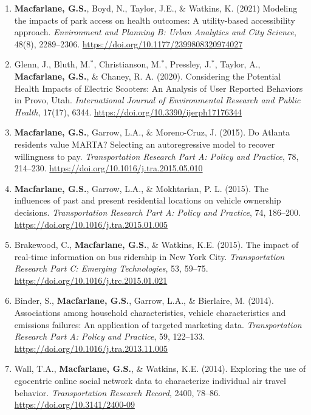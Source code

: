 \documentclass[margin,line]{res}
\newif\ifdetail
\newcounter{enuminitialize}
\newenvironment{myenum}[1][]
{%
 \setcounter{enuminitialize}{#1}
 \addtocounter{enuminitialize}{2}
 \begin{enumerate}[left= 4pt, itemsep=12pt, start=\value{enuminitialize}, label=\arabic*\addtocounter{enumi}{-2}]
}
{%
 \end{enumerate}
}
\begin{document}
\begin{resume}
\begin{myenum}[14]
  \item\textbf{Macfarlane, G.S.}, Boyd, N., Taylor, J.E., \& Watkins, K. (2021) Modeling the impacts of park access
on health outcomes: A utility-based accessibility approach. \textit{ Environment and
Planning B: Urban Analytics and City Science}, 48(8), 2289–2306. \url{https://doi.org/10.1177/2399808320974027}

  \item Glenn, J., Bluth, M.$^*$, Christianson, M.$^*$, Pressley, J.$^*$, Taylor, A.,
\textbf{Macfarlane, G.S.}, \& Chaney, R. A. (2020). Considering the Potential Health
Impacts of Electric Scooters: An Analysis of User Reported Behaviors in Provo,
Utah. \textit{ International Journal of Environmental Research and Public Health},
17(17), 6344. \url{https://doi.org/10.3390/ijerph17176344} \ifdetail Citations: 5  \fi

  \item\textbf{Macfarlane, G.S.}, Garrow, L.A., \& Moreno-Cruz, J. (2015). Do Atlanta
residents value MARTA? Selecting an autoregressive model to recover willingness
to pay. \textit{ Transportation Research Part A: Policy and Practice}, 78, 214–230.
\url{https://doi.org/10.1016/j.tra.2015.05.010} \ifdetail Citations: 8 \fi

  \item\textbf{Macfarlane, G.S.}, Garrow, L.A., \& Mokhtarian, P. L. (2015). The influences of
past and present residential locations on vehicle ownership decisions.
\textit{ Transportation Research Part A: Policy and Practice}, 74, 186–200.
\url{https://doi.org/10.1016/j.tra.2015.01.005} \ifdetail Citations: 40  \fi

  \item Brakewood, C., \textbf{Macfarlane, G.S.}, \& Watkins, K.E. (2015). The impact of
real-time information on bus ridership in New York City. \textit{ Transportation Research
Part C: Emerging Technologies}, 53, 59–75. \url{https://doi.org/10.1016/j.trc.2015.01.021} \ifdetail Citations: 144  \fi

  \item Binder, S., \textbf{Macfarlane, G.S.}, Garrow, L.A., \& Bierlaire, M. (2014).
Associations among household characteristics, vehicle characteristics and
emissions failures: An application of targeted marketing data. \textit{ Transportation
Research Part A: Policy and Practice}, 59, 122–133.
\url{https://doi.org/10.1016/j.tra.2013.11.005}\ifdetail Citations: 16  \fi

  \item Wall, T.A., \textbf{Macfarlane, G.S.}, \& Watkins, K.E. (2014). Exploring the use of
egocentric online social network data to characterize individual air travel
behavior. \textit{ Transportation Research Record}, 2400, 78–86.
\url{https://doi.org/10.3141/2400-09} \ifdetail Citations: 9  \fi


\end{myenum}
\end{resume}
\end{document}
